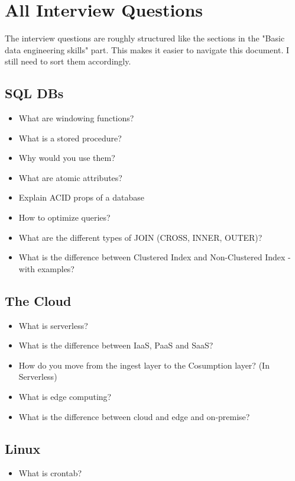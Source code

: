 \documentclass[12pt, numbers=noenddot]{scrreprt} %
\begin{document}
\chapter{All Interview Questions}

The interview questions are roughly structured like the sections in the "Basic data engineering skills" part.
This makes it easier to navigate this document. I still need to sort them accordingly.

\section*{SQL DBs}

\begin{itemize}
\item What are windowing functions?
\item What is a stored procedure?
\item Why would you use them?
\item What are atomic attributes?
\item Explain ACID props of a database
\item How to optimize queries?
\item What are the different types of JOIN (CROSS, INNER, OUTER)?
\item What is the difference between Clustered Index and Non-Clustered Index - with examples?
\end{itemize}

\section*{The Cloud}

\begin{itemize}
\item What is serverless?
\item What is the difference between IaaS, PaaS and SaaS?
\item How do you move from the ingest layer to the Cosumption layer? (In Serverless)
\item What is edge computing?
\item What is the difference between cloud and edge and on-premise?
\end{itemize}

\section*{Linux}

\begin{itemize}
\item What is crontab?
\end{itemize}
\end{document}
